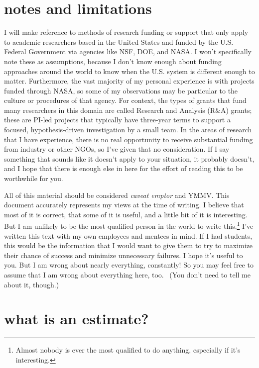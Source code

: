 \documentclass[12pt,oneside]{book}
\begin{document}
\newpage
{}
\section*{notes and limitations}
\label{scrivauto:8}

I will make reference to methods of research funding or support that only apply to academic researchers based in the United States and funded by the U.S. Federal Government via agencies like NSF, DOE, and NASA. I won't specifically note these as assumptions, because I don't know enough about funding approaches around the world to know when the U.S. system is different enough to matter. Furthermore, the vast majority of my personal experience is with projects funded through NASA, so some of my observations may be particular to the culture or procedures of that agency. For context, the types of grants that fund many researchers in this domain are called Research and Analysis (R\&A) grants; these are PI-led projects that typically have three-year terms to support a focused, hypothesis-driven investigation by a small team. In the areas of research that I have experience, there is no real opportunity to receive substantial funding from industry or other NGOs, so I've given that no consideration. If I say something that sounds like it doesn't apply to your situation, it probably doesn't, and I hope that there is enough else in here for the effort of reading this to be worthwhile for you.

All of this material should be considered \emph{caveat emptor} and YMMV. This document accurately represents my views at the time of writing. I believe that most of it is correct, that some of it is useful, and a little bit of it is interesting. But I am unlikely to be the most qualified person in the world to write this.\footnote{
Almost nobody is ever the most qualified to do anything, especially if it's interesting.}
I've written this text with my own employees and mentees in mind. If I had students, this would be the information that I would want to give them to try to maximize their chance of success and minimize unnecessary failures. I hope it's useful to you. But I am wrong about nearly everything, constantly! So you may feel free to assume that I am wrong about everything here, too.  (You don't need to tell me about it, though.)

\newpage
{}
\section*{what is an estimate?}
\label{scrivauto:9}
\end{document}
